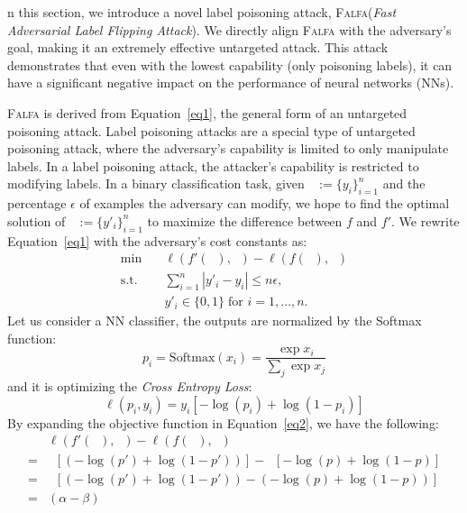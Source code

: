 \documentclass[runningheads]{llncs}
\newcommand{\falfa}{\textsc{Falfa}\xspace}
\DeclareMathOperator*{\Xtr}{\mathcal{X}_\text{train}}
\DeclareMathOperator*{\ytr}{\mathcal{Y}_\text{train}}
\DeclareMathOperator*{\ypo}{\mathcal{Y}^\prime_\text{train}}
\begin{document}
n this section, we introduce a novel label poisoning attack, \falfa (\emph{Fast Adversarial Label Flipping Attack}).
We directly align \falfa with the adversary's goal, making it an extremely effective untargeted attack.
This attack demonstrates that even with the lowest capability (only poisoning labels), it can have a significant negative impact on the performance of neural networks (NNs).

\falfa is derived from Equation~\ref{eq1}, the general form of an untargeted poisoning attack.
Label poisoning attacks are a special type of untargeted poisoning attack, where the adversary's capability is limited to only manipulate labels.
In a label poisoning attack, the attacker's capability is restricted to modifying labels.
In a binary classification task, given $\ytr:=\{y_i\}^n_{i=1}$ and the percentage $\epsilon$ of examples  the adversary can modify,
we hope to find the optimal solution of $\ypo:=\{y'_i\}^n_{i=1}$ to maximize the difference between $f$ and $f'$.
We rewrite Equation~\ref{eq1} with the adversary's cost constants as:
\begin{equation}
    \begin{aligned}
        \min_{\ypo} \quad   & \ell(f'(\Xtr), \ypo) - \ell(f(\Xtr), \ypo)           \\
        \textrm{s.t.} \quad & \sum_{i=1}^{n} |y'_i - y_i| \leq n \epsilon,         \\
        \quad               & y'_i \in \{0, 1\}  \; \text{for } i = 1,  \ldots, n.
    \end{aligned}
    \label{eq2}
\end{equation}
Let us consider a NN classifier, the outputs are normalized by the Softmax function:
\begin{equation}
    p_i = \text{Softmax}(x_i) = \frac{\exp{x_i}}{\sum_j\exp{x_j}}
\end{equation}
and it is optimizing the \emph{Cross Entropy Loss}:
\begin{equation}
    \ell(p_i, y_i) = y_i[-\log(p_i) + \log(1-p_i)]
\end{equation}
By expanding the objective function in Equation~\ref{eq2}, we have the following:
\begin{equation*}
    \begin{aligned}
          & \ell(f'(\Xtr), \ypo) - \ell(f(\Xtr), \ypo)                  \\
        = & \ypo[(-\log(p') + \log(1-p'))] - \ypo[-\log(p) + \log(1-p)] \\
        = & \ypo[(-\log(p') + \log(1-p')) - (-\log(p) + \log(1-p))]     \\
        = & (\alpha - \beta)\ypo
    \end{aligned}
    \label{eq3}
\end{equation*}
\end{document}
